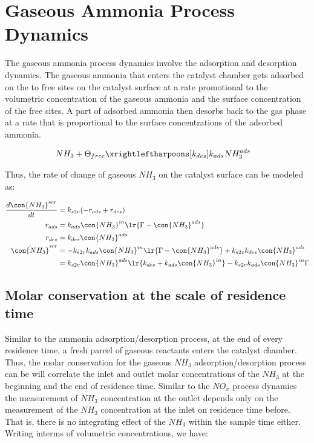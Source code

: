 \newpage
\section{Gaseous Ammonia Process Dynamics}
The gaseous ammonia process dynamics involve the adsorption and desorption
dynamics. The gaseous ammonia that enters the catalyst chamber gets adsorbed on
the to free sites on the catalyst surface at a rate promotional to the
volumetric concentration of the gaseous ammonia and the surface concentration
of the free sites. A part of adsorbed ammonia then desorbs back to the gas
phase at a rate that is proportional to the surface concentrations of the
adsorbed ammonia.

\begin{align*}
    NH_3 + \Theta_{free} &\xrightleftharpoons[k_{des}]{k_{ads}} NH_3^{ads}
\end{align*}

Thus, the rate of change of gaseous $NH_3$ on the catalyst surface can be modeled as:

\begin{align*}
    \frac{d \con{NH_3}^{scr}}{dt} &= k_{s2v} (-r_{ads} + r_{des}) \\
    r_{ads} &= k_{ads} \con{NH_3}^{in} \lr{\Gamma - \con{NH_3}^{ads}}\\
    r_{des} &= k_{des} \con{NH_3}^{ads}\\
    \dot{\con{NH_3}}^{scr} &= -k_{s2v}k_{ads} \con{NH_3}^{in} \lr{\Gamma - \con{NH_3}^{ads}} + k_{s2v} k_{des} \con{NH_3}^{ads}\\
    &= k_{s2v} \con{NH_3}^{ads} \lr{k_{des} + k_{ads} \con{NH_3}^{in}} - k_{s2v} k_{ads} \con{NH_3}^{in} \Gamma
\end{align*}


\subsection{Molar conservation at the scale of residence time}

Similar to the ammonia adsorption/desorption process, at the end of every
residence time, a fresh parcel of gaseous reactants enters the catalyst
chamber. Thus, the molar conservation for the gaseous $NH_3$
adsorption/desorption process can be will correlate the inlet and outlet molar
concentrations of the $NH_3$ at the beginning and the end of residence time.
Similar to the $NO_x$ process dynamics the measurement of $NH_3$ concentration
at the outlet depends only on the measurement of the $NH_3$ concentration at the
inlet on residence time before. That is, there is no integrating effect of the
$NH_3$ within the sample time either. Writing interms of volumetric concentrations, we have:


